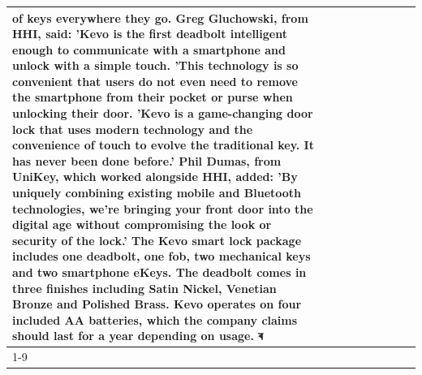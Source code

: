 \begin{table}[H]
\begin{tabular}{lllrlllll}
of keys everywhere they go. Greg Gluchowski, from HHI, said: 'Kevo is the first deadbolt intelligent enough to communicate with a smartphone and unlock with a simple touch. 'This technology is so convenient that users do not even need to remove the smartphone from their pocket or purse when unlocking their door. 'Kevo is a game-changing door lock that uses modern technology and the convenience of touch to evolve the traditional key. It has never been done before.' Phil Dumas, from UniKey, which worked alongside HHI, added: 'By uniquely combining existing mobile and Bluetooth technologies, we’re bringing your front door into the digital age without compromising the look or security of the lock.' The Kevo smart lock package includes one deadbolt, one fob, two mechanical keys and two smartphone eKeys. The deadbolt comes in three finishes including Satin Nickel, Venetian Bronze and Polished Brass. Kevo operates on four included AA batteries, which the company claims should last for a year depending on usage. ৰ \\
\cline{1-9}

\end{tabular}
\end{table}
